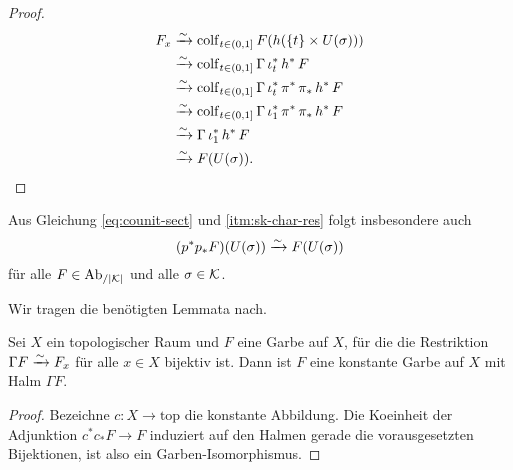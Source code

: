 \begin{proof}
  \begin{align*}
     F_x &\xrightarrow[]{\sim} \operatorname{colf}\limits_{t \in (0, 1]} F(h(\{t\} \times U(\sigma))) \\
         &\xrightarrow[]{\sim} \operatorname{colf}\limits_{t \in (0, 1]} \Gamma \, \iota_t^* \, h^* \, F \\
         &\xrightarrow[]{\sim} \operatorname{colf}\limits_{t \in (0, 1]}
           \Gamma \, \iota_t^* \, \pi^* \, \pi_* \, h^* \, F \\
           &\xrightarrow[]{\sim} \operatorname{colf}\limits_{t \in (0, 1]}
             \Gamma \, \iota_1^* \, \pi^* \, \pi_* \, h^* \, F \\
         &\xrightarrow[]{\sim} \Gamma \, \iota_1^* \, h^* \, F \\    
         &\xrightarrow[]{\sim} F(U(\sigma)).
  \end{align*}
\end{proof}
\begin{bem} \label{beta-sect}
  Aus Gleichung \ref{eq:counit-sect} und \ref{itm:sk-char-res} folgt
  insbesondere auch
  \[(p^* p_* F)(U(\sigma)) \xrightarrow[]{\sim} F(U(\sigma)) \]
  für alle $F \in \operatorname{Ab}_{/|\mathcal{K}|}$ und alle $\sigma \in \mathcal{K}$.
\end{bem}

Wir tragen die benötigten Lemmata nach.
\begin{lemma} \label{const-stalk}
  Sei $X$ ein topologischer Raum und $F$ eine Garbe auf $X$, für die
  die Restriktion $\Gamma F \xrightarrow[]{\sim} F_x$ für alle $x \in X$ bijektiv
  ist. Dann ist $F$ eine konstante Garbe auf $X$ mit Halm $\Gamma F$.
\end{lemma}
\begin{proof}
  Bezeichne $c: X \to \mathrm{top}$ die konstante Abbildung. Die
  Koeinheit der Adjunktion $c^* c_* F \to F$ induziert auf den Halmen
  gerade die vorausgesetzten Bijektionen, ist also ein
  Garben-Isomorphismus.
\end{proof}

